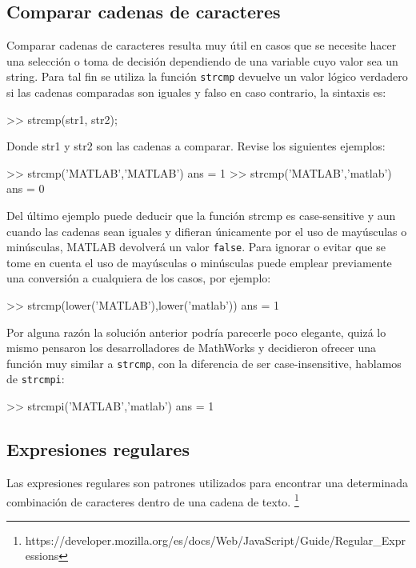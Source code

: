 \subsection{Comparar cadenas de caracteres}\label{comparar-cadenas-de-caracteres}

Comparar cadenas de caracteres resulta muy útil en casos que se necesite
hacer una selección o toma de decisión dependiendo de una variable cuyo
valor sea un string. Para tal fin se utiliza la función \texttt{strcmp}
devuelve un valor lógico verdadero si las cadenas comparadas son iguales
y falso en caso contrario, la sintaxis es:

\begin{matlab}
>> strcmp(str1, str2);
\end{matlab}

Donde str1 y str2 son las cadenas a comparar. Revise los siguientes
ejemplos:

\begin{matlab}
>> strcmp('MATLAB','MATLAB')
ans =
     1
>> strcmp('MATLAB','matlab')
ans =
     0
\end{matlab}

Del último ejemplo puede deducir que la función strcmp es case-sensitive
y aun cuando las cadenas sean iguales y difieran únicamente por el uso
de mayúsculas o minúsculas, MATLAB devolverá un valor \texttt{false}.
Para ignorar o evitar que se tome en cuenta el uso de mayúsculas o
minúsculas puede emplear previamente una conversión a cualquiera de los
casos, por ejemplo:

\begin{matlab}
>> strcmp(lower('MATLAB'),lower('matlab'))
ans =
     1
\end{matlab}

Por alguna razón la solución anterior podría parecerle poco elegante,
quizá lo mismo pensaron los desarrolladores de MathWorks y decidieron
ofrecer una función muy similar a \texttt{strcmp}, con la diferencia de ser
case-insensitive, hablamos de \texttt{strcmpi}:

\begin{matlab}
>> strcmpi('MATLAB','matlab')
ans =
     1
\end{matlab}

\subsection{Expresiones regulares}\label{expresiones-regulares}

Las expresiones regulares son patrones utilizados para encontrar una
determinada combinación de caracteres dentro de una cadena de texto.
\footnote{https://developer.mozilla.org/es/docs/Web/JavaScript/Guide/Regular\_Expressions} \\

